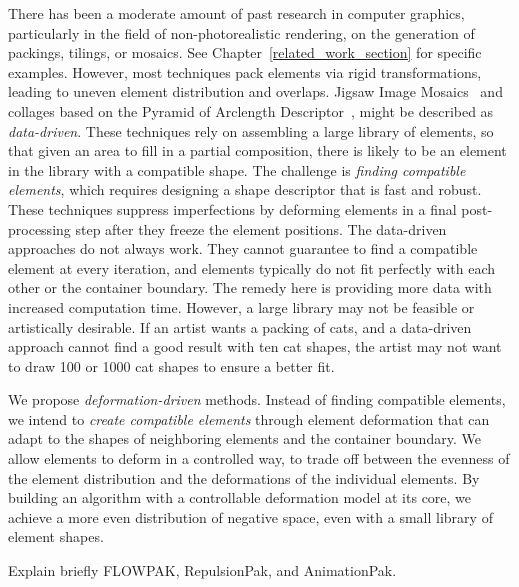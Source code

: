 There has been a moderate amount of past research in computer
graphics, particularly in the field of non-photorealistic rendering,
on the generation of packings, tilings, or mosaics.  
See Chapter~\ref{related_work_section} for specific examples.  
However,  most techniques pack elements via rigid transformations, leading to
uneven element distribution and overlaps.  
Jigsaw Image Mosaics~\cite{Kim2002} and collages based on the Pyramid of Arclength
Descriptor~\cite{Kwan2016}, might be described as \textit{data-driven}.
These techniques rely on assembling a large library of elements, so that given an
area to fill in a partial composition, there is likely to be an
element in the library with a compatible shape.  The challenge is 
\textit{finding compatible elements}, 
which requires designing a shape descriptor that is fast and robust.
These techniques suppress imperfections by deforming
elements in a final post-processing step after they freeze the element positions.
The data-driven approaches do not always work.
They cannot guarantee to find a compatible element
at every iteration, and
elements typically do not fit perfectly with each other 
or the container boundary.
The remedy here is providing more data with increased computation time.
However, a large library may not be feasible or artistically desirable.
If an artist wants a packing of cats, and a data-driven approach 
cannot find a good result with ten cat shapes, 
the artist may not want to draw 100 or 1000 cat shapes to ensure a better fit.




We propose \textit{deformation-driven} methods.
Instead of finding compatible elements,
we intend to \textit{create compatible elements} through element deformation
that can adapt to the shapes of neighboring elements and the container boundary.
We allow elements to deform in a controlled way,
to trade off between the evenness of the element distribution and 
the deformations of the individual elements.
By building an algorithm with a controllable deformation model at its core, we achieve a
more even distribution of negative space, even with a small library of element shapes.



\mynote
{
Explain briefly FLOWPAK, RepulsionPak, and AnimationPak. 
}